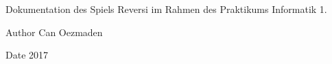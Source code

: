 Dokumentation des Spiels Reversi im Rahmen des Praktikums Informatik 1.

\begin{DoxyAuthor}{Author}
Can Oezmaden 
\end{DoxyAuthor}
\begin{DoxyDate}{Date}
2017 
\end{DoxyDate}
